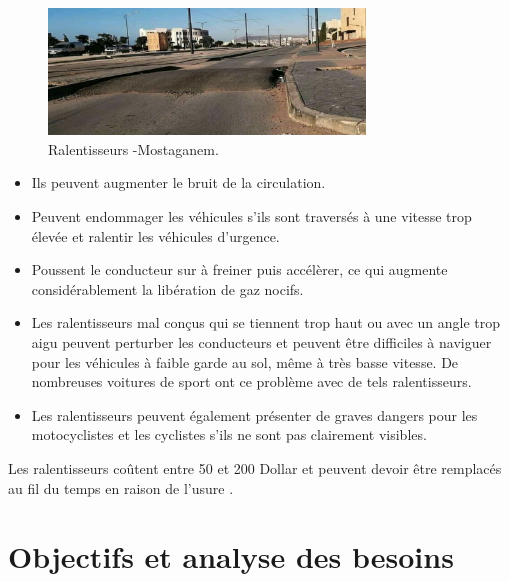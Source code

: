 \begin{figure}[h!]
  \center
  \includegraphics[width=0.75\textwidth]{Images/chapter1/Speedbump.jpg}
  \caption{Ralentisseurs -Mostaganem.}
\end{figure}
\renewcommand{\labelitemi}{$\bullet$}
\begin{itemize}
  \item Ils peuvent augmenter le bruit de la circulation.
  \item Peuvent endommager les véhicules s'ils sont traversés à une vitesse trop élevée et ralentir les véhicules d'urgence.
  \item Poussent le conducteur sur à freiner puis accélèrer, ce qui augmente considérablement la libération de gaz nocifs.
  \item Les ralentisseurs mal conçus qui se tiennent trop haut ou avec un angle
        trop aigu peuvent perturber les conducteurs et peuvent être difficiles à naviguer pour les véhicules à faible garde au sol,
        même à très basse vitesse. De nombreuses voitures de sport ont ce problème avec de tels ralentisseurs.
  \item Les ralentisseurs peuvent également présenter de graves dangers pour les motocyclistes et les cyclistes s'ils ne sont pas clairement visibles.
\end{itemize}

Les ralentisseurs coûtent entre 50 et 200 Dollar et peuvent devoir être remplacés au fil du temps
en raison de l'usure \cite{SpeedBump2020}.



\section{Objectifs et analyse des besoins}

